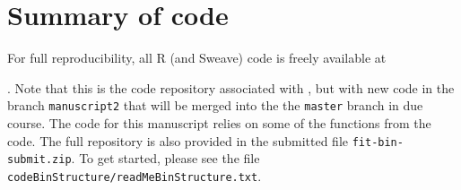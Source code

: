 \documentclass[12pt, letter]{article}
\newcommand{\MEE}{erpbb17}     %
\begin{document}
\section{Summary of code\label{sec:code}}

For full reproducibility, all R (and Sweave) code is freely available at

. Note
that this is the code repository associated with \citet{\MEE},
but with new code in the branch
{\tt manuscript2} that will be merged into the the {\tt master} branch in due
course. The code for this manuscript relies on some of the functions from the
\citet{\MEE} code. The full repository is also provided in the submitted file
{\tt fit-bin-submit.zip}. To get started, please see the file {\tt codeBinStructure/readMeBinStructure.txt}.





\end{document}
